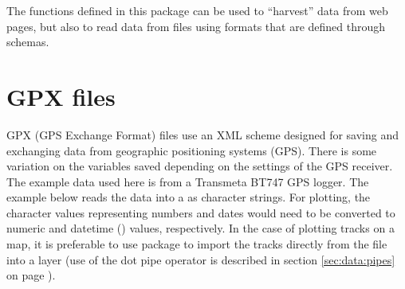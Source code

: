 \documentclass[krantz2]{krantz}\usepackage{knitr}
\begin{document}
The functions defined in this package can be used to ``harvest'' data from web pages, but also to read data from files using formats that are defined through  schemas.

\section{GPX files}
GPX (GPS Exchange Format) files use an XML scheme designed for saving and exchanging data from geographic positioning systems (GPS). There is some variation on the variables saved depending on the settings of the GPS receiver. The example data used here is from a Transmeta BT747 GPS logger. The example below reads the data into a  as character strings. For plotting, the character values representing numbers and dates would need to be converted to numeric and datetime () values, respectively. In the case of plotting tracks on a map, it is preferable to use package  to import the tracks directly from the  file into a layer (use of the dot pipe operator is described in section \ref{sec:data:pipes} on page \pageref{sec:data:pipes}).

\begin{knitrout}\footnotesize
{}\color{fgcolor}
\end{knitrout}
\end{document}
